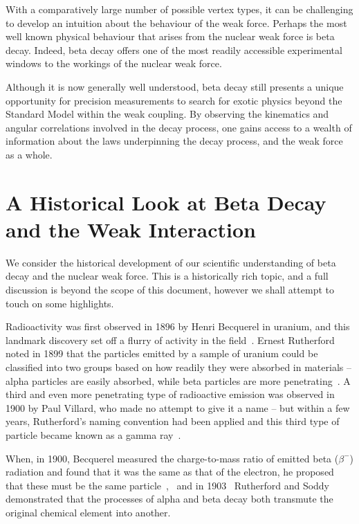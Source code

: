With a comparatively large number of possible vertex types, it can be challenging to develop an intuition about the behaviour of the weak force. 
Perhaps the most well known physical behaviour that arises from the nuclear weak force is beta decay. 
Indeed, beta decay
offers one of the most readily accessible experimental windows to the workings of the nuclear weak force.

Although it is now generally well understood, beta decay still presents a unique opportunity for precision measurements to search for exotic physics beyond the Standard Model within the weak coupling.
By observing the kinematics and angular correlations involved in the decay process, one gains access to a wealth of information about the 
laws underpinning the decay process, and the weak force as a whole.  



\section{A Historical Look at Beta Decay and the Weak Interaction}

We consider the historical development of our scientific understanding of beta decay and the nuclear weak force.  This is a historically rich topic, and a full discussion is beyond the scope of this document, however we shall attempt to touch on some highlights.

Radioactivity was first observed in 1896 by Henri Becquerel in uranium, and this landmark discovery set off a flurry of activity in the field~\cite{becquerel1896}.
Ernest Rutherford noted in 1899 that the particles emitted by a sample of uranium could be classified into two groups based on how readily they were absorbed in materials -- alpha particles are easily absorbed, while beta particles are more penetrating~\cite{rutherford1899}.  A third and even more penetrating type of radioactive emission was observed in 1900 by Paul Villard, who made no attempt to give it a name -- but within a few years, Rutherford's naming convention had been applied and this third type of particle became known as a gamma ray~\cite{villard1900}\cite{rutherford1903}.  


When, in 1900, Becquerel measured the charge-to-mass ratio of emitted beta ($\beta^-$) radiation and found that it was the same as that of the electron, he proposed that these must be the same particle~\cite{becquerel1900},~ and in 1903~ Rutherford and Soddy demonstrated that the processes of alpha and beta decay both transmute the original chemical element into another\cite{rutherfordsoddy1903}.



